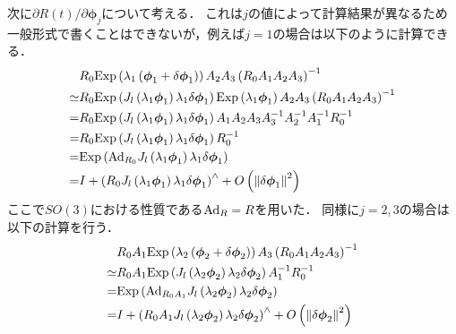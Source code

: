 次に$\partial R(t) / \partial \boldsymbol \phi_{j}$について考える．
これは$j$の値によって計算結果が異なるため一般形式で書くことはできないが，例えば$j=1$の場合は以下のように計算できる．
%
\begin{align}
  \begin{split}
    & R_{0} {\rm Exp} \left( \lambda_{1} \left( \boldsymbol \phi_{1} + \delta \boldsymbol \phi_{1} \right) \right) A_{2} A_{3} \left( R_{0} A_{1} A_{2} A_{3} \right)^{-1} \\
    \simeq & R_{0} {\rm Exp} \left( J_{l} \left( \lambda_{1} \boldsymbol \phi_{1} \right) \lambda_{1} \delta \boldsymbol \phi_{1} \right) {\rm Exp} \left( \lambda_{1} \boldsymbol \phi_{1} \right) A_{2} A_{3} \left( R_{0} A_{1} A_{2} A_{3} \right)^{-1} \\
    = & R_{0} {\rm Exp} \left( J_{l} \left( \lambda_{1} \boldsymbol \phi_{1} \right) \lambda_{1} \delta \boldsymbol \phi_{1} \right) A_{1} A_{2} A_{3} A_{3}^{-1} A_{2}^{-1} A_{1}^{-1} R_{0}^{-1} \\
    = & R_{0} {\rm Exp} \left( J_{l} \left( \lambda_{1} \boldsymbol \phi_{1} \right) \lambda_{1} \delta \boldsymbol \phi_{1} \right)  R_{0}^{-1} \\
    = & {\rm Exp} \left( {\rm Ad}_{R_{0}} J_{l} \left( \lambda_{1} \boldsymbol \phi_{1} \right) \lambda_{1} \delta \boldsymbol \phi_{1} \right) \\
    = & I + \left( R_{0} J_{l} \left( \lambda_{1} \boldsymbol \phi_{1} \right) \lambda_{1} \delta \boldsymbol \phi_{1} \right)^{\wedge} + O \left( \left\| \delta \boldsymbol \phi_{1} \right\|^{2} \right)
  \end{split}
\end{align}
%
ここで$SO(3)$における性質である${\rm Ad}_{R} = R$を用いた．
同様に$j=2,3$の場合は以下の計算を行う．
%
\begin{align}
  \begin{split}
    & R_{0} A_{1} {\rm Exp} \left( \lambda_{2} \left( \boldsymbol \phi_{2} + \delta \boldsymbol \phi_{2} \right) \right) A_{3} \left( R_{0} A_{1} A_{2} A_{3} \right)^{-1} \\
    \simeq & R_{0} A_{1} {\rm Exp} \left( J_{l} \left( \lambda_{2} \boldsymbol \phi_{2} \right) \lambda_{2} \delta \boldsymbol \phi_{2} \right) A_{1}^{-1} R_{0}^{-1} \\
    = & {\rm Exp} \left( {\rm Ad}_{R_{0} A_{1} } J_{l} \left( \lambda_{2} \boldsymbol \phi_{2} \right) \lambda_{2} \delta \boldsymbol \phi_{2} \right) \\
    = & I + \left( R_{0} A_{1} J_{l} \left( \lambda_{2} \boldsymbol \phi_{2} \right) \lambda_{2} \delta \boldsymbol \phi_{2} \right)^{\wedge} + O \left( \left\| \delta \boldsymbol \phi_{2} \right\|^{2} \right)
  \end{split}
\end{align}
